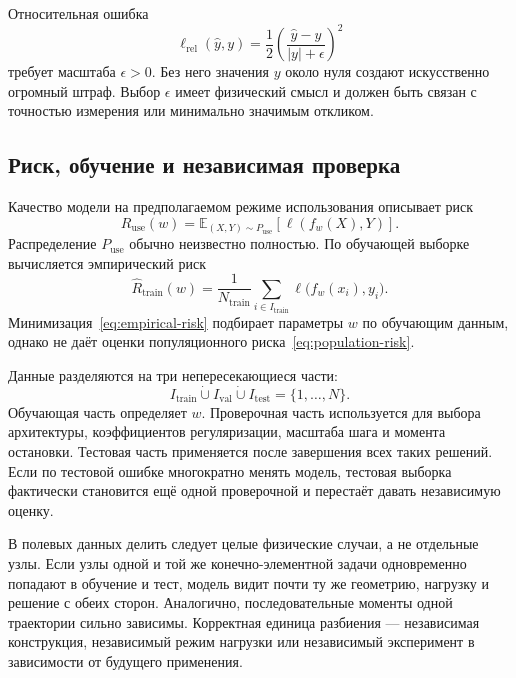 Относительная ошибка
\begin{equation}
 \ell_{\mathrm{rel}}(\widehat y,y)
 =
 \frac12
 \left(
 \frac{\widehat y-y}{|y|+\epsilon}
 \right)^2
\end{equation}
требует масштаба $\epsilon>0$. Без него значения $y$ около нуля создают искусственно огромный штраф. Выбор $\epsilon$ имеет физический смысл и должен быть связан с точностью измерения или минимально значимым откликом.

\subsection{Риск, обучение и независимая проверка}
Качество модели на предполагаемом режиме использования описывает риск
\begin{equation}
\label{eq:population-risk}
 R_{\mathrm{use}}(w)
 =
 \mathbb E_{(X,Y)\sim P_{\mathrm{use}}}
 \left[
 \ell(f_w(X),Y)
 \right].
\end{equation}
Распределение $P_{\mathrm{use}}$ обычно неизвестно полностью. По обучающей выборке вычисляется эмпирический риск
\begin{equation}
\label{eq:empirical-risk}
 \widehat R_{\mathrm{train}}(w)
 =
 \frac1{N_{\mathrm{train}}}
 \sum_{i\in I_{\mathrm{train}}}
 \ell\bigl(f_w(x_i),y_i\bigr).
\end{equation}
Минимизация~\eqref{eq:empirical-risk} подбирает параметры $w$ по обучающим данным, однако не даёт оценки популяционного риска~\eqref{eq:population-risk}.

Данные разделяются на три непересекающиеся части:
\begin{equation}
 I_{\mathrm{train}}
 \mathbin{\dot\cup}
 I_{\mathrm{val}}
 \mathbin{\dot\cup}
 I_{\mathrm{test}}
 =
 \{1,\ldots,N\}.
\end{equation}
Обучающая часть определяет $w$. Проверочная часть используется для выбора архитектуры, коэффициентов регуляризации, масштаба шага и момента остановки. Тестовая часть применяется после завершения всех таких решений. Если по тестовой ошибке многократно менять модель, тестовая выборка фактически становится ещё одной проверочной и перестаёт давать независимую оценку.

В полевых данных делить следует целые физические случаи, а не отдельные узлы. Если узлы одной и той же конечно-элементной задачи одновременно попадают в обучение и тест, модель видит почти ту же геометрию, нагрузку и решение с обеих сторон. Аналогично, последовательные моменты одной траектории сильно зависимы. Корректная единица разбиения --- независимая конструкция, независимый режим нагрузки или независимый эксперимент в зависимости от будущего применения.

